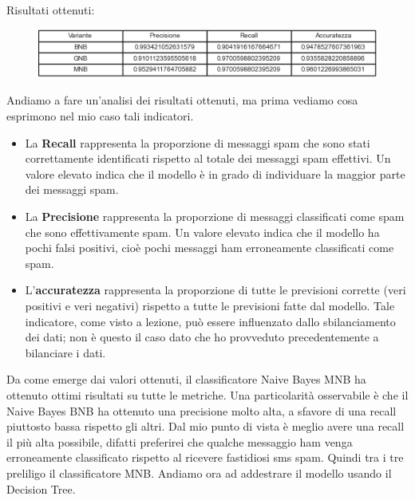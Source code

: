 \documentclass[]{article}
\begin{document}
                    Risultati ottenuti:
                    \begin{figure}[H]
                        \centering
                        \includegraphics[width=1\linewidth]{images/resultTableNaiveBayes.png}
                        \label{fig:enter-label}
                    \end{figure}
                    Andiamo a fare un'analisi dei risultati ottenuti, ma prima vediamo cosa esprimono nel mio caso tali indicatori.
                    \begin{itemize}
                        \item La \textbf{Recall} rappresenta la proporzione di messaggi spam che sono stati correttamente identificati rispetto al totale dei messaggi spam effettivi. Un valore elevato indica che il modello è in grado di individuare la maggior parte dei messaggi spam.
                        \item La \textbf{Precisione} rappresenta la proporzione di messaggi classificati come spam che sono effettivamente spam. Un valore elevato indica che il modello ha pochi falsi positivi, cioè pochi messaggi ham erroneamente classificati come spam.
                        \item L'\textbf{accuratezza} rappresenta la proporzione di tutte le previsioni corrette (veri positivi e veri negativi) rispetto a tutte le previsioni fatte dal modello. Tale indicatore, come visto a lezione, può essere influenzato dallo sbilanciamento dei dati; non è questo il caso dato che ho provveduto precedentemente a bilanciare i dati.
                    \end{itemize}
                    Da come emerge dai valori ottenuti, il classificatore Naive Bayes MNB ha ottenuto ottimi risultati su tutte le metriche. Una particolarità osservabile è che il Naive Bayes BNB ha ottenuto una precisione molto alta, a sfavore di una recall piuttosto bassa rispetto gli altri. Dal mio punto di vista è meglio avere una recall il più alta possibile, difatti preferirei che qualche messaggio ham venga erroneamente classificato rispetto al ricevere fastidiosi sms spam. Quindi tra i tre preliligo il classificatore MNB.
                    Andiamo ora ad addestrare il modello usando il Decision Tree.
\end{document}
